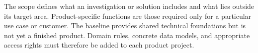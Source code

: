 \begin{beginnerstatement}

The scope defines what an investigation or solution includes and what lies
outside its target area. Product-specific functions are those required only for
a particular use case or customer. The baseline provides shared technical
foundations but is not yet a finished product. Domain rules, concrete data
models, and appropriate access rights must therefore be added to each product
project.

\end{beginnerstatement}
